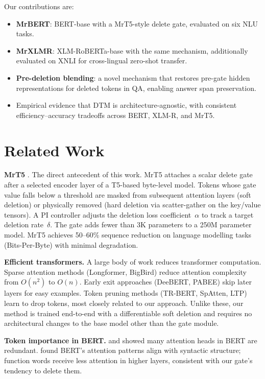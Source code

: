 \documentclass[11pt,a4paper]{article}
\begin{document}
Our contributions are:

\begin{itemize}[nosep]
    \item \textbf{MrBERT}: BERT-base with a MrT5-style delete gate, evaluated on six NLU tasks.
    \item \textbf{MrXLMR}: XLM-RoBERTa-base with the same mechanism, additionally evaluated on XNLI for cross-lingual zero-shot transfer.
    \item \textbf{Pre-deletion blending}: a novel mechanism that restores pre-gate hidden representations for deleted tokens in QA, enabling answer span preservation.
    \item Empirical evidence that DTM is architecture-agnostic, with consistent efficiency--accuracy tradeoffs across BERT, XLM-R, and MrT5.
\end{itemize}


\section{Related Work}
\label{sec:related-work}

\textbf{MrT5} \citep{kallini2024mrt5}. The direct antecedent of this work. MrT5 attaches a scalar delete gate after a selected encoder layer of a T5-based byte-level model. Tokens whose gate value falls below a threshold are masked from subsequent attention layers (soft deletion) or physically removed (hard deletion via scatter-gather on the key/value tensors). A PI controller adjusts the deletion loss coefficient~$\alpha$ to track a target deletion rate~$\delta$. The gate adds fewer than 3K parameters to a 250M parameter model. MrT5 achieves 50--60\% sequence reduction on language modelling tasks (Bits-Per-Byte) with minimal degradation.

\textbf{Efficient transformers.} A large body of work reduces transformer computation. Sparse attention methods (Longformer, BigBird) reduce attention complexity from $O(n^2)$ to $O(n)$. Early exit approaches (DeeBERT, PABEE) skip later layers for easy examples. Token pruning methods (TR-BERT, SpAtten, LTP) learn to drop tokens, most closely related to our approach. Unlike these, our method is trained end-to-end with a differentiable soft deletion and requires no architectural changes to the base model other than the gate module.

\textbf{Token importance in BERT.} \citet{michel2019heads} and \citet{voita2019heads} showed many attention heads in BERT are redundant. \citet{clark2019attention} found BERT's attention patterns align with syntactic structure; function words receive less attention in higher layers, consistent with our gate's tendency to delete them.
\end{document}
